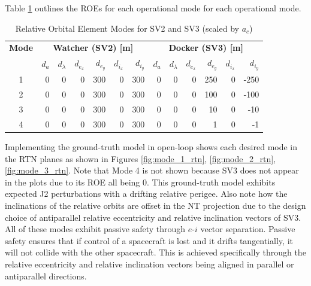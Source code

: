 Table \ref{tab:roe_modes_summary} outlines the ROEs for each operational mode for each operational mode.
\begin{table}[h!]
\centering
\begin{tabular}{|c|rrrrrr|rrrrrr|}
\hline
\textbf{Mode} & \multicolumn{6}{c|}{\textbf{Watcher (SV2) [m]}} & \multicolumn{6}{c|}{\textbf{Docker (SV3) [m]}} \\
\cline{2-13}
 & $d_a$ & $d_\lambda$ & $d_{e_x}$ & $d_{e_y}$ & $d_{i_x}$ & $d_{i_y}$ 
 & $d_a$ & $d_\lambda$ & $d_{e_x}$ & $d_{e_y}$ & $d_{i_x}$ & $d_{i_y}$ \\
\hline
1 & 0 & 0 & 0 & 300 & 0 & 300 & 0 & 0 & 0 & 250 & 0 & -250 \\
2 & 0 & 0 & 0 & 300 & 0 & 300 & 0 & 0 & 0 & 100 & 0 & -100 \\
3 & 0 & 0 & 0 & 300 & 0 & 300 & 0 & 0 & 0 & 10  & 0 & -10 \\
4 & 0 & 0 & 0 & 300 & 0 & 300 & 0 & 0 & 0 & 1   & 0 & -1 \\
\hline
\end{tabular}
\caption{Relative Orbital Element Modes for SV2 and SV3 (scaled by $a_c$)}
\label{tab:roe_modes_summary}
\end{table}

Implementing the ground-truth model in open-loop shows each desired mode in the RTN planes as shown in Figures \ref{fig:mode_1_rtn}, \ref{fig:mode_2_rtn}, \ref{fig:mode_3_rtn}. Note that Mode 4 is not shown because SV3 does not appear in the plots due to its ROE all being 0. This ground-truth model exhibits expected J2 perturbations with a drifting relative perigee. Also note how the inclinations of the relative orbits are offset in the NT projection due to the design choice of antiparallel relative eccentricity and relative inclination vectors of SV3. All of these modes exhibit passive safety through $e$-$i$ vector separation. Passive safety ensures that if control of a spacecraft is lost and it drifts tangentially, it will not collide with the other spacecraft. This is achieved specifically through the relative eccentricity and relative inclination vectors being aligned in parallel or antiparallel directions. 


